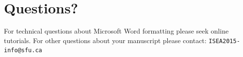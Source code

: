 \documentclass[letterpaper]{article}
\begin{document}
\section{Questions?}

For technical questions about Microsoft Word formatting please seek online tutorials. For other questions about your manuscript please contact: {\tt ISEA2015-info@sfu.ca}




\end{document}
